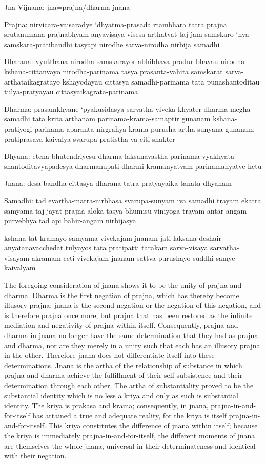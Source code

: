 
Jna Vijnana:
jna=prajna/dharma-jnana

Prajna:
  nirvicara-vaisaradye ‘dhyatma-prasada
  rtambhara tatra prajna
  srutanumana-prajnabhyam anyavisaya visesa-arthatvat
  taj-jam samskaro ‘nya-samskara-pratibandhi
  tasyapi nirodhe sarva-nirodha nirbija samadhi

  Dharana:
    vyutthana-nirodha-samskarayor abhibhava-pradur-bhavau nirodha-kshana-cittanvayo nirodha-parinama
    tasya prasanta-vahita samskarat
    sarva-arthataikagratayo kshayodayau cittasya samadhi-parinama
    tata punashantoditau tulya-pratyayau cittasyaikagrata-parinama

Dharma:
  prasamkhyane ‘pyakusidasya sarvatha viveka-khyater dharma-megha samadhi
  tata krita arthanam parinama-krama-samaptir gunanam
  kshana-pratiyogi parinama aparanta-nirgrahya krama
  purusha-artha-sunyana gunanam pratiprasava kaivalya svarupa-pratistha va citi-shakter

  Dhyana:
    etena bhutendriyesu dharma-laksanavastha-parinama vyakhyata
    shantoditavyapadesya-dharmanupati dharmi
    kramanyatvam parinamanyatve hetu

Jnana:
    desa-bandha cittasya dharana
    tatra pratyayaika-tanata dhyanam

  Samadhi:
    tad evartha-matra-nirbhasa svarupa-sunyam iva samadhi
    trayam ekatra samyama
    taj-jayat prajna-aloka
    tasya bhumisu viniyoga
    trayam antar-angam purvebhya
    tad api bahir-angam nirbijasya

    kshana-tat-kramayo samyama vivekajam jnanam
    jati-laksana-deshair anyatanavacchedat tulyayos tata pratipatti
    tarakam sarva-visaya sarvatha-visayam akramam ceti vivekajam jnanam
    sattva-purushayo suddhi-samye kaivalyam

The foregoing consideration of jnana shows it to be the unity of prajna and dharma.
Dharma is the first negation of prajna, which has thereby become illusory prajna;
jnana is the second negation or the negation of this negation,
and is therefore prajna once more, but prajna that has been restored as
the infinite mediation and negativity of prajna within itself.
Consequently, prajna and dharma in jnana no longer have the same determination
that they had as prajna and dharma,
nor are they merely in a unity such that each has an illusory prajna in the other.
Therefore jnana does not differentiate itself into these determinations.
Jnana is the artha of the relationship of substance in which
prajna and dharma achieve the fulfillment of their self-subsistence
and their determination through each other.
The artha of substantiality proved to be the substantial identity
which is no less a kriya and only as such is substantial identity.
The kriya is prakasa and krama;
consequently, in jnana, prajna-in-and-for-itself has
attained a true and adequate reality,
for the kriya is itself prajna-in-and-for-itself.
This kriya constitutes the difference of jnana within itself;
because the kriya is immediately prajna-in-and-for-itself,
the different moments of jnana are themselves the whole jnana,
universal in their determinateness and identical with their negation.

